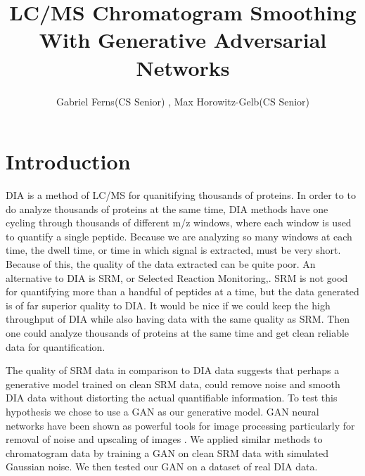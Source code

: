 \documentclass[12pt]{article}
\title{LC/MS Chromatogram Smoothing With Generative Adversarial Networks}
\author{Gabriel Ferns(CS Senior) , Max Horowitz-Gelb(CS Senior)}
\begin{document}
\maketitle


\section{Introduction}
DIA \cite{DIA} is a method of LC/MS for quanitifying thousands of proteins. In order to to do analyze thousands of proteins at the same time, DIA methods have one cycling through thousands of different m/z windows, where each window is used to quantify a single peptide. Because we are analyzing so many windows at each time, the dwell time, or time in which signal is extracted, must be very short. Because of this, the quality of the data extracted can be quite poor. An alternative to DIA is SRM, or Selected Reaction Monitoring,\cite{SRM}. SRM is not good for quantifying more than a handful of peptides at a time, but the data generated is of far superior quality to DIA. It would be nice if we could keep the high throughput of DIA while also having data with the same quality as SRM. Then one could analyze thousands of proteins at the same time and get clean reliable data for quantification.

The quality of SRM data in comparison to DIA data suggests that perhaps a generative model trained on clean SRM data, could remove noise and smooth DIA data without distorting the actual quantifiable information. To test this hypothesis we chose to use a GAN as our generative model. GAN neural networks have been shown as powerful tools for image processing particularly for removal of noise and upscaling of images \cite{SRGAN}\cite{DERAIN}. We applied similar methods to chromatogram data by training a GAN on clean SRM data with simulated Gaussian noise. We then tested our GAN on a dataset of real DIA data.
\end{document}
